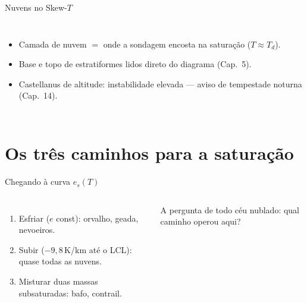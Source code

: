 \documentclass[aspectratio=169,11pt]{beamer}
\begin{document}
\begin{frame}{Nuvens no Skew-$T$}
  \begin{columns}
    \begin{itemize}
      \item Camada de nuvem $=$ onde a sondagem encosta na saturação
            ($T \approx T_d$).
      \item Base e topo de estratiformes lidos direto do diagrama
            (Cap.~5).
      \item Castellanus de altitude: instabilidade \alert{elevada} —
            aviso de tempestade noturna (Cap.~14).
    \end{itemize}
  \end{columns}
\end{frame}

\section{Os três caminhos para a saturação}

\begin{frame}{Chegando à curva $e_s(T)$}
  \begin{columns}
    \begin{enumerate}
      \item \alert{Esfriar} ($e$ const): orvalho, geada, nevoeiros.
      \item \alert{Subir} ($-9{,}8$\,K/km até o LCL): quase todas as
            nuvens.
      \item \alert{Misturar} duas massas subsaturadas: bafo, contrail.
    \end{enumerate}
    \vspace{0.3em}
    A pergunta de todo céu nublado: qual caminho operou aqui?
  \end{columns}
\end{frame}
\end{document}
